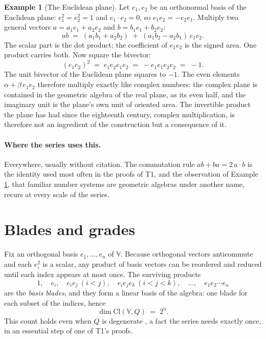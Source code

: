 \documentclass[11pt]{article}
\theoremstyle{plain}
\theoremstyle{definition}
\newtheorem{example}{Example}[section]
\newcommand{\Cl}{\mathrm{Cl}}
\begin{document}
\begin{example}[The Euclidean plane]\label{ex:plane}
Let $e_1, e_2$ be an orthonormal basis of the Euclidean plane: $e_1^{2} = e_2^{2} = 1$ and $e_1 \cdot e_2 = 0$, so $e_1 e_2 = -e_2 e_1$. Multiply two general vectors $a = a_1 e_1 + a_2 e_2$ and $b = b_1 e_1 + b_2 e_2$:
\[
ab \;=\; (a_1 b_1 + a_2 b_2) \;+\; (a_1 b_2 - a_2 b_1)\, e_1 e_2 .
\]
The scalar part is the dot product; the coefficient of $e_1 e_2$ is the signed area. One product carries both. Now square the bivector:
\[
(e_1 e_2)^{2} \;=\; e_1 e_2 e_1 e_2 \;=\; - e_1 e_1 e_2 e_2 \;=\; -1 .
\]
The unit bivector of the Euclidean plane squares to $-1$. The even elements $\alpha + \beta\, e_1 e_2$ therefore multiply exactly like complex numbers: the complex plane is contained in the geometric algebra of the real plane, as its even half, and the imaginary unit is the plane's own unit of oriented area. The invertible product the plane has had since the eighteenth century, complex multiplication, is therefore not an ingredient of the construction but a consequence of it.
\end{example}

\paragraph{Where the series uses this.} Everywhere, usually without citation. The commutation rule $ab + ba = 2\,a\cdot b$ is the identity used most often in the proofs of T1, and the observation of Example \ref{ex:plane}, that familiar number systems are geometric algebras under another name, recurs at every scale of the series.

\section{Blades and grades}\label{sec:blades}

Fix an orthogonal basis $e_1, \dots, e_n$ of $\mathbb{V}$. Because orthogonal vectors anticommute and each $e_i^{2}$ is a scalar, any product of basis vectors can be reordered and reduced until each index appears at most once. The surviving products
\[
1, \quad e_i, \quad e_i e_j \ (i<j), \quad e_i e_j e_k \ (i<j<k), \quad \dots, \quad e_1 e_2 \cdots e_n
\]
are the \emph{basis blades}, and they form a linear basis of the algebra: one blade for each subset of the indices, hence
\[
\dim \Cl(\mathbb{V}, Q) \;=\; 2^{n} .
\]
This count holds even when $Q$ is degenerate \cite{Chevalley1997}, a fact the series needs exactly once, in an essential step of one of T1's proofs.
\end{document}
